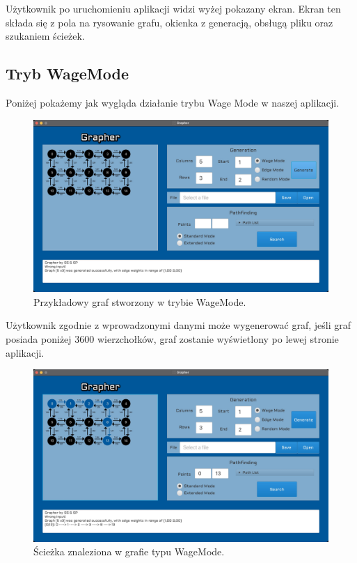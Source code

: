 \documentclass[10pt, a4paper]{report}
\begin{document}
Użytkownik po uruchomieniu aplikacji widzi wyżej pokazany ekran. Ekran ten
składa się z pola na rysowanie grafu, okienka z generacją, obsługą pliku oraz
szukaniem ścieżek.
\newpage

\subsection{Tryb WageMode}\label{subsec:wywołania-wagemode}
Poniżej pokażemy jak wygląda działanie trybu Wage Mode w naszej aplikacji.

\begin{figure}[h]
  \begin{center}
    \includegraphics[scale=0.165]{grapherWageModeGeneration.jpg}
    \caption{Przykładowy graf stworzony w trybie WageMode.}
  \end{center}
\end{figure}

Użytkownik zgodnie z wprowadzonymi danymi może wygenerować graf, jeśli graf
posiada poniżej 3600 wierzchołków, graf zostanie wyświetlony po lewej stronie
aplikacji.
\newpage

\begin{figure}[h]
  \begin{center}
    \includegraphics[scale=0.165]{grapherWageModeWithPath.jpg}
    \caption{Ścieżka znaleziona w grafie typu WageMode.}
  \end{center}
\end{figure}
\end{document}
